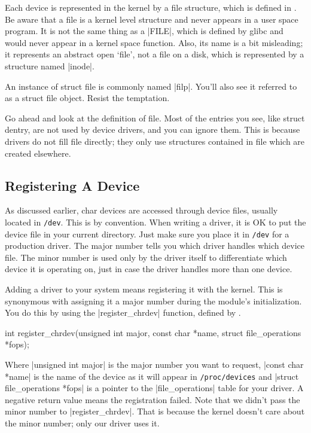 \documentclass[10pt, oneside]{book}
\begin{document}
Each device is represented in the kernel by a file structure, which is defined in .
Be aware that a file is a kernel level structure and never appears in a user space program.
It is not the same thing as a \cpp|FILE|, which is defined by glibc and would never appear in a kernel space function.
Also, its name is a bit misleading; it represents an abstract open `file', not a file on a disk, which is represented by a structure named \cpp|inode|.

An instance of struct file is commonly named \cpp|filp|.
You'll also see it referred to as a struct file object.
Resist the temptation.

Go ahead and look at the definition of file.
Most of the entries you see, like struct dentry, are not used by device drivers, and you can ignore them.
This is because drivers do not fill file directly; they only use structures contained in file which are created elsewhere.

\subsection{Registering A Device}
\label{sec:register_device}
As discussed earlier, char devices are accessed through device files, usually located in \verb|/dev|.
This is by convention. When writing a driver, it is OK to put the device file in your current directory.
Just make sure you place it in \verb|/dev| for a production driver.
The major number tells you which driver handles which device file.
The minor number is used only by the driver itself to differentiate which device it is operating on, just in case the driver handles more than one device.

Adding a driver to your system means registering it with the kernel.
This is synonymous with assigning it a major number during the module's initialization.
You do this by using the \cpp|register_chrdev| function, defined by .

\begin{code}
int register_chrdev(unsigned int major, const char *name, struct file_operations *fops);
\end{code}

Where \cpp|unsigned int major| is the major number you want to request, \cpp|const char *name| is the name of the device as it will appear in \verb|/proc/devices| and \cpp|struct file_operations *fops| is a pointer to the \cpp|file_operations| table for your driver.
A negative return value means the registration failed. Note that we didn't pass the minor number to \cpp|register_chrdev|.
That is because the kernel doesn't care about the minor number; only our driver uses it.
\end{document}
